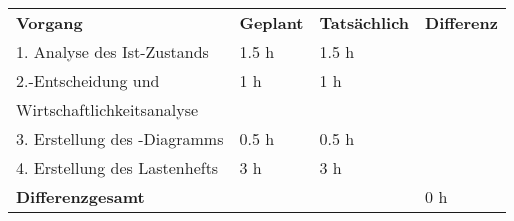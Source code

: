 \begin{tabu}{llll}
\rowfont{\bfseries\leavevmode\color{headingfont}}\textbf{Vorgang} & \textbf{Geplant} & \textbf{Tatsächlich} & \textbf{Differenz} \\
1. Analyse des Ist-Zustands & 1.5 h & 1.5 h & \\
2.-Entscheidung und & 1 h & 1 h & \\
Wirtschaftlichkeitsanalyse & & & \\
3. Erstellung des -Diagramms & 0.5 h & 0.5 h & \\
4. Erstellung des Lastenhefts & 3 h & 3 h & \\
\hline
\hline
{}\textbf{Differenzgesamt} & & & 0 h \\
\end{tabu}
